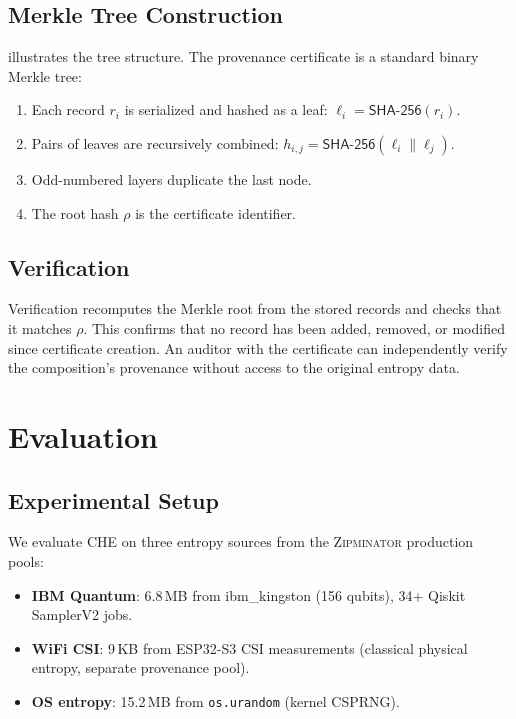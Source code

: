 \documentclass[11pt,a4paper]{article}
\newcommand{\zipminator}{\textsc{Zipminator}\xspace}
\newcommand{\che}{\textsc{CHE}\xspace}
\begin{document}
\subsection{Merkle Tree Construction}
\label{sec:provenance:merkle}

 illustrates the tree structure.
The provenance certificate is a standard binary Merkle tree:
\begin{enumerate}
  \item Each record $r_i$ is serialized and hashed as a leaf:
        $\ell_i = \mathsf{SHA\text{-}256}(r_i)$.
  \item Pairs of leaves are recursively combined:
        $h_{i,j} = \mathsf{SHA\text{-}256}(\ell_i \| \ell_j)$.
  \item Odd-numbered layers duplicate the last node.
  \item The root hash $\rho$ is the certificate identifier.
\end{enumerate}

\subsection{Verification}
\label{sec:provenance:verification}

Verification recomputes the Merkle root from the stored records and
checks that it matches $\rho$.
%
This confirms that no record has been added, removed, or modified
since certificate creation.
%
An auditor with the certificate can independently verify the
composition's provenance without access to the original entropy data.


\section{Evaluation}
\label{sec:evaluation}

\subsection{Experimental Setup}
\label{sec:eval:setup}

We evaluate \che on three entropy sources from the \zipminator
production pools:
\begin{itemize}
  \item \textbf{IBM Quantum}: 6.8\,MB from ibm\_kingston (156
        qubits), 34+ Qiskit SamplerV2 jobs.
  \item \textbf{WiFi CSI}: 9\,KB from ESP32-S3 CSI measurements
        (classical physical entropy,
        separate provenance pool).
  \item \textbf{OS entropy}: 15.2\,MB from \texttt{os.urandom}
        (kernel CSPRNG).
\end{itemize}
\end{document}
